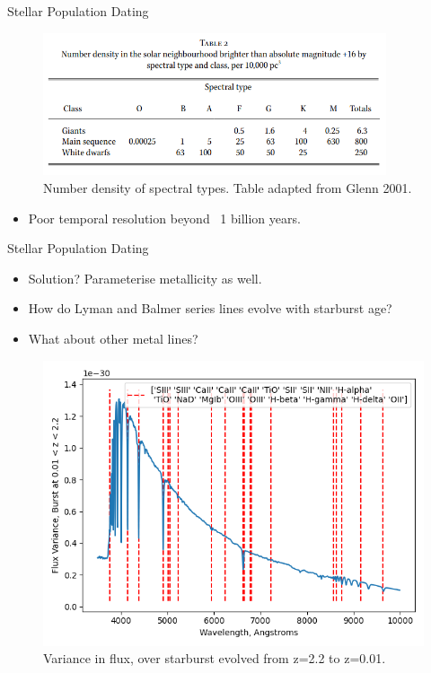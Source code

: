 \documentclass{beamer}
\begin{document}
\begin{frame}{Stellar Population Dating}
  \begin{figure}
    \centering
    \includegraphics[width=0.9\textwidth]{Screenshot}
    \caption{Number density of spectral types. Table adapted from Glenn 2001.}
  \end{figure}
  \begin{itemize}
    \item Poor temporal resolution beyond ~1 billion years.
  \end{itemize}
\end{frame}

\begin{frame}{Stellar Population Dating}
  \begin{itemize}
    \item Solution? Parameterise metallicity as well.
    \item How do Lyman and Balmer series lines evolve with starburst age?
    \item What about other metal lines?
  \end{itemize}
\end{frame}

\begin{frame}{}
  \begin{figure}
    \centering
    \includegraphics[width=\textwidth]{figure}
    \caption{Variance in flux, over starburst evolved from z=2.2 to z=0.01.}
  \end{figure}
\end{frame}
\end{document}
